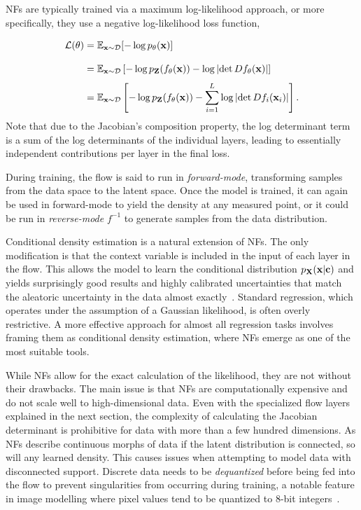 NFs are typically trained via a maximum log-likelihood approach, or more specifically, they use a negative log-likelihood loss function,
\begin{equation}
    \label{eq:nf_loss}
    \begin{aligned}
        \mathcal{L}(\theta)
        \frach & = \mathbb{E}_{\x \sim \mathcal{D}}[-\log p_{\theta}(\x)]                                                                        \\
        \frach & = \mathbb{E}_{\x \sim \mathcal{D}}\left[-\log p_{\Z}(f_{\theta}(\x)) - \log \left|\det D f_{\theta}(\x) \right|\right]          \\
        \frach & = \mathbb{E}_{\x \sim \mathcal{D}}\left[-\log p_{\Z}(f_{\theta}(\x)) - \sum_{i=1}^L \log \left|\det D f_i(\x_i) \right|\right].
    \end{aligned}
\end{equation}
Note that due to the Jacobian's composition property, the log determinant term is a sum of the log determinants of the individual layers, leading to essentially independent contributions per layer in the final loss.

During training, the flow is said to run in \textit{forward-mode}, transforming samples from the data space to the latent space.
Once the model is trained, it can again be used in forward-mode to yield the density at any measured point, or it could be run in \textit{reverse-mode} $f^{-1}$ to generate samples from the data distribution.

Conditional density estimation is a natural extension of NFs.
The only modification is that the context variable is included in the input of each layer in the flow.
This allows the model to learn the conditional distribution $p_{\mathbf{X}}(\mathbf{x}|\mathbf{c})$ and yields surprisingly good results and highly calibrated uncertainties that match the aleatoric uncertainty in the data almost exactly~\cite{SolvingInverseProblems, InferenceAstrophysicalParameters, ComposingNormalizingFlows, NormalizingFlowsProbabilistic}.
Standard regression, which operates under the assumption of a Gaussian likelihood, is often overly restrictive.
A more effective approach for almost all regression tasks involves framing them as conditional density estimation, where NFs emerge as one of the most suitable tools.

While NFs allow for the exact calculation of the likelihood, they are not without their drawbacks.
The main issue is that NFs are computationally expensive and do not scale well to high-dimensional data.
Even with the specialized flow layers explained in the next section, the complexity of calculating the Jacobian determinant is prohibitive for data with more than a few hundred dimensions.
As NFs describe continuous morphs of data if the latent distribution is connected, so will any learned density.
This causes issues when attempting to model data with disconnected support.
Discrete data needs to be \textit{dequantized} before being fed into the flow to prevent singularities from occurring during training, a notable feature in image modelling where pixel values tend to be quantized to 8-bit integers~\cite{FlowImprovingFlowBased}.

